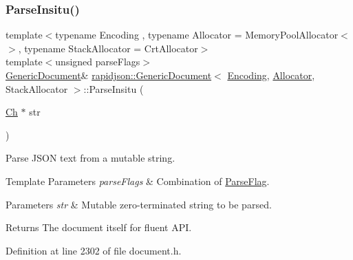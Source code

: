 \subsubsection{\texorpdfstring{ParseInsitu()}{ParseInsitu()}\hspace{0.1cm}{\footnotesize\ttfamily [1/2]}}
{\footnotesize\ttfamily template$<$typename Encoding , typename Allocator  = Memory\+Pool\+Allocator$<$$>$, typename Stack\+Allocator  = Crt\+Allocator$>$ \\
template$<$unsigned parse\+Flags$>$ \\
\mbox{\hyperlink{classrapidjson_1_1_generic_document}{Generic\+Document}}\& \mbox{\hyperlink{classrapidjson_1_1_generic_document}{rapidjson\+::\+Generic\+Document}}$<$ \mbox{\hyperlink{classrapidjson_1_1_encoding}{Encoding}}, \mbox{\hyperlink{classrapidjson_1_1_allocator}{Allocator}}, Stack\+Allocator $>$\+::Parse\+Insitu (\begin{DoxyParamCaption}\item[{\mbox{\hyperlink{classrapidjson_1_1_generic_value_adcdbc7fa85a9a41b78966d7e0dcc2ac4}{Ch}} $\ast$}]{str }\end{DoxyParamCaption})}



Parse J\+S\+ON text from a mutable string. 


\begin{DoxyTemplParams}{Template Parameters}
{\em parse\+Flags} & Combination of \mbox{\hyperlink{namespacerapidjson_a81379eb4e94a0386d71d15fda882ebc9}{Parse\+Flag}}. \\
\hline
\end{DoxyTemplParams}

\begin{DoxyParams}{Parameters}
{\em str} & Mutable zero-\/terminated string to be parsed. \\
\hline
\end{DoxyParams}
\begin{DoxyReturn}{Returns}
The document itself for fluent A\+PI. 
\end{DoxyReturn}


Definition at line 2302 of file document.\+h.


\begin{DoxyCode}{0}

\end{DoxyCode}
\mbox{\label{classrapidjson_1_1_generic_document_af061c039a990c2970dc31e5626149367}} 
